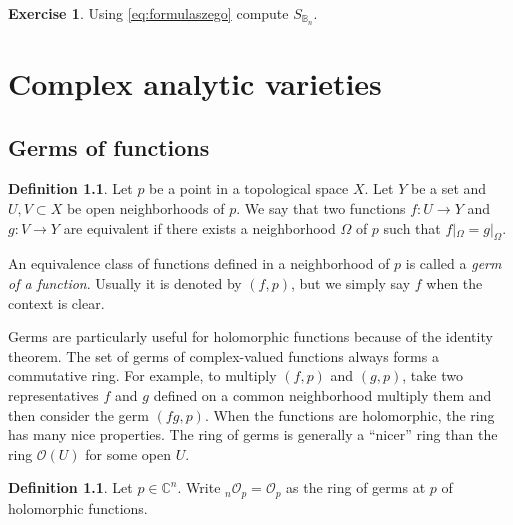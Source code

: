 \documentclass[12pt,openany]{book}
\newcommand{\C}{{\mathbb{C}}}
\newcommand{\bB}{{\mathbb{B}}}
\newcommand{\sO}{{\mathscr{O}}}
\newcommand{\myindex}[1]{#1\index{#1}}
\theoremstyle{plain}
\theoremstyle{remark}
\theoremstyle{definition}
\newtheorem{defn}[thm]{Definition}
\newenvironment{exbox}{%
    \def\FrameCommand{\vrule width 1pt \relax\hspace {10pt}}%
    \MakeFramed {\advance \hsize -\width \FrameRestore }%
}{%
    \endMakeFramed
}
\theoremstyle{exercise}
\newtheorem{exercise}{Exercise}[section]
\theoremstyle{example}
\begin{document}
\begin{exbox}
\begin{exercise}
Using \eqref{eq:formulaszego} compute $S_{\bB_n}$.
\end{exercise}
\end{exbox}

%
%
%
%


\chapter{Complex analytic varieties} \label{ch:analyticvarieties}


\section{Germs of functions}

\begin{defn}
Let $p$ be a point in a topological space $X$.  Let $Y$ be a set and
$U, V \subset X$ be open neighborhoods of $p$.  We say that
two functions $f \colon U \to Y$ and
$g \colon V \to Y$ are equivalent if there exists a neighborhood
$\Omega$ of $p$ such that $f|_\Omega = g|_\Omega$.

An equivalence class of functions defined in a neighborhood of $p$
is called a \emph{\myindex{germ of a function}}.
Usually it is denoted by $(f,p)$, but we simply say $f$ when
the context is clear.
\end{defn}

Germs are particularly useful for holomorphic functions because of the identity
theorem.  The set of germs of complex-valued functions always forms a
commutative ring.
For example, to multiply $(f,p)$ and $(g,p)$, take two representatives
$f$ and $g$ defined on a common neighborhood multiply them and
then consider the germ $(fg,p)$.
When the functions are holomorphic, the ring has many nice properties.
The ring of germs is generally a ``nicer'' ring than the ring $\sO(U)$ for
some open $U$.

\begin{defn}
Let $p \in \C^n$.
Write
${}_n\sO_p = \sO_p$ as the ring of germs at $p$ of holomorphic functions.
\end{defn}
\end{document}
